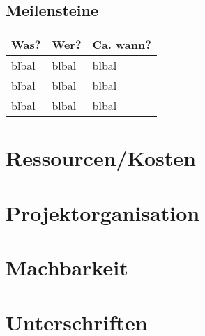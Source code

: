 \subsection{Meilensteine}

\begin{tabular}{ | l | l | l |}
    \hline
    Was? & Wer? & Ca. wann? \\ \hline
    blbal & blbal & blbal \\ \hline
    blbal & blbal & blbal \\ \hline
    blbal & blbal & blbal \\ \hline
\end{tabular}

\section{Ressourcen/Kosten}

\section{Projektorganisation}

\section{Machbarkeit}

\section{Unterschriften}